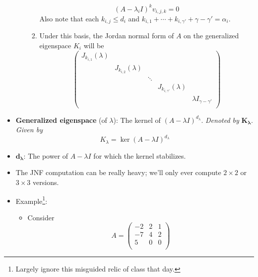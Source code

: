 \documentclass[../notes.tex]{subfiles}
\begin{document}
\begin{itemize}
\begin{enumerate}
\begin{enumerate}
            \begin{equation*}
                (A-\lambda_iI)^kv_{i,j,k} = 0
            \end{equation*}
            Also note that each $k_{i,j}\leq d_i$ and $k_{i,1}+\cdots+k_{i,\gamma'}+\gamma-\gamma'=\alpha_i$.
            \item Under this basis, the Jordan normal form of $A$ on the generalized eigenspace $K_i$ will be
            \begin{equation*}
                \begin{pmatrix}
                    J_{k_{i,1}}(\lambda) &  &  &  & \\
                     & J_{k_{i,2}}(\lambda) &  &  & \\
                     &  & \ddots &  & \\
                     &  &  & J_{k_{i,\gamma'}}(\lambda) & \\
                     &  &  &  & \lambda I_{\gamma-\gamma'}\\
                \end{pmatrix}
            \end{equation*}
        \end{enumerate}
    \end{enumerate}
    \item \textbf{Generalized eigenspace} (of $\lambda$): The kernel of $(A-\lambda I)^{d_\lambda}$. \emph{Denoted by} $\bm{K_\lambda}$. \emph{Given by}
    \begin{equation*}
        K_\lambda = \ker(A-\lambda I)^{d_\lambda}
    \end{equation*}
    \item $\bm{d_\lambda}$: The power of $A-\lambda I$ for which the kernel stabilizes.
    \item The JNF computation can be really heavy; we'll only ever compute $2\times 2$ or $3\times 3$ versions.
    \item Example\footnote{Largely ignore this misguided relic of class that day.}:
    \begin{itemize}
        \item Consider
        \begin{equation*}
            A =
            \begin{pmatrix}
                -2 & 2 & 1\\
                -7 & 4 & 2\\
                5 & 0 & 0\\
            \end{pmatrix}

\end{equation*}
\end{itemize}
\end{itemize}
\end{document}
